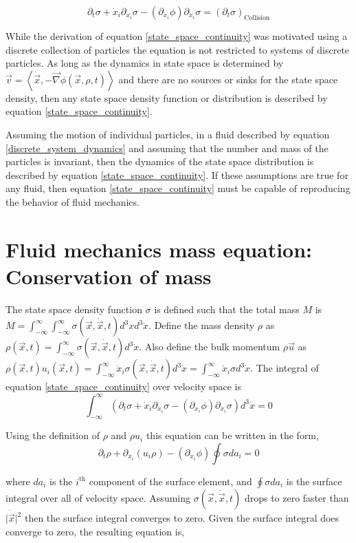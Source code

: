 \documentclass[%
 twocolumn,
 amsmath,amssymb,
 aps,
]{revtex4-1}
\newcommand{\dvec}[1]{\dot{\vec{#1}}}
\newcommand{\grad}{\vec{\nabla}}
\newcommand{\intVdot}[1]{\int_{-\infty}^{\infty} #1 d^3\dot{x}}
\newcommand{\intVVdot}[1]{\int_{-\infty}^{\infty}\int_{-\infty}^{\infty} #1 d^3xd^3\dot{x}}
\begin{document}
\[
\partial_t \sigma + \dot{x}_i\partial_{x_i}\sigma-\left(\partial_{x_i}\phi\right)\partial_{\dot{x}_i}\sigma=\left(\partial_t \sigma\right)_{\text{Collision}}
\]

While the derivation of equation \eqref{state_space_continuity} was motivated using a discrete collection of particles the equation is not restricted to systems of discrete particles. As long as the dynamics in state space is determined by $\vec{v}=\left\langle\dvec{x}, -\grad\phi(\vec{x}, \rho, t)\right\rangle$ and there are no sources or sinks for the state space density, then any state space density function or distribution is described by equation \eqref{state_space_continuity}.

Assuming the motion of individual particles, in a fluid described by equation \eqref{discrete_system_dynamics} and assuming that the number and mass of the particles is invariant, then the dynamics of the state space distribution is described by equation \eqref{state_space_continuity}. If these assumptions are true for any fluid, then equation \eqref{state_space_continuity} must be capable of reproducing the behavior of fluid mechanics.



\section{Fluid mechanics mass equation: Conservation of mass}
The state space density function $\sigma$ is defined such that the total mass $M$ is $M=\intVVdot{\sigma(\vec{x}, \dvec{x}, t)}$. Define the mass density $\rho$ as $\rho(\vec{x}, t)=\intVdot{\sigma(\vec{x}, \dvec{x}, t)}$. Also define the bulk momentum $\rho\vec{u}$ as $\rho(\vec{x}, t) u_i(\vec{x}, t)=\intVdot{\dot{x}_i\sigma(\vec{x}, \dvec{x}, t)}=\intVdot{\dot{x}_i\sigma}$. The integral of equation \eqref{state_space_continuity} over velocity space is
\[
\intVdot{\left(\partial_t \sigma + \dot{x}_i\partial_{x_i}\sigma-\left(\partial_{x_i}\phi\right)\partial_{\dot{x}_i}\sigma\right)}=0
\]

Using the definition of $\rho$ and $\rho u_i$ this equation can be written in the form,
\[
\partial_t\rho + \partial_{x_i}\left(u_i\rho\right)-\left(\partial_{x_i}\phi\right)\oint{\sigma da_i}=0
\]

where $da_i$ is the $i^{\text{th}}$ component of the surface element, and $\oint{\sigma da_i}$ is the surface integral over all of velocity space. Assuming $\sigma(\vec{x}, \dvec{x}, t)$ drops to zero faster than $\lvert\dvec{x}\rvert^2$ then the surface integral converges to zero. Given the surface integral does converge to zero, the resulting equation is, 
\end{document}
